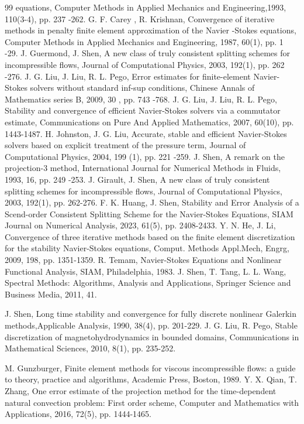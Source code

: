 \documentclass[10pt]{article}
\begin{document}
\begin{thebibliography}{99}
		equations, Computer Methods in Applied Mechanics and Engineering,1993, 110(3-4), pp. 237 -262.
		 G. F. Carey , R. Krishnan, Convergence of iterative methods in penalty finite element approximation
		of the Navier -Stokes equations, Computer Methods in Applied Mechanics and Engineering, 1987, 60(1), pp. 1 -29.
		J. Guermond, J. Shen, A new class of truly consistent splitting schemes for incompressible flows, Journal of Computational Physics, 2003, 192(1), pp. 262 -276.
		 J. G. Liu, J. Liu, R. L. Pego, Error estimates for finite-element Navier-Stokes solvers without standard inf-sup conditions,  Chinese Annals of Mathematics series B, 2009, 30 , pp. 743 -768.
		J. G. Liu, J. Liu, R. L. Pego, Stability and convergence of efficient Navier-Stokes solvers via a commutator estimate, Communications on Pure And Applied Mathematics, 2007, 60(10), pp. 1443-1487.
		H. Johnston, J. G. Liu, Accurate, stable and efficient Navier-Stokes solvers based on explicit treatment of the pressure term, Journal of Computational Physics, 2004, 199 (1), pp. 221 -259.
		J. Shen, A remark on the projection-3 method, International Journal for Numerical Methods in Fluids, 1993, 16, pp. 249 -253.
		 J. Girault, J. Shen, A new class of truly consistent splitting schemes for incompressible flows, Journal of Computational Physics, 2003, 192(1), pp. 262-276.
		 F. K. Huang, J. Shen, Stability and Error Analysis of a Scend-order Consistent Splitting Scheme for the Navier-Stokes Equations, SIAM Journal on Numerical Analysis, 2023, 61(5), pp. 2408-2433.
		 Y. N. He, J. Li, Convergence of three iterative methods based on the finite element discretization for the stability Navier-Stokes equations, Comput. Methods Appl.Mech, Engrg, 2009, 198, pp. 1351-1359.
		 R. Temam, Navier-Stokes Equations and Nonlinear Functional Analysis, SIAM, Philadelphia, 1983.
		J. Shen, T. Tang, L. L. Wang, Spectral Methods: Algorithms, Analysis and Applications, Springer Science and Business Media, 2011, 41.
		
		
		J. Shen, Long time stability and convergence for fully discrete nonlinear Galerkin methods,Applicable Analysis, 1990, 38(4), pp. 201-229.
		J. G. Liu, R. Pego, Stable discretization of magnetohydrodynamics in bounded domains, Communications in Mathematical Sciences, 2010, 8(1), pp. 235-252.
		
		 M. Gunzburger, Finite element methods for viscous incompressible flows: a guide to theory, practice
		and algorithms, Academic Press, Boston, 1989.
		 Y. X. Qian, T. Zhang, One error estimate of the projection method for the time-dependent natural convection problem: First order scheme, Computer and Mathematics with Applications, 2016, 72(5), pp. 1444-1465.
	\end{thebibliography}
\end{document}
